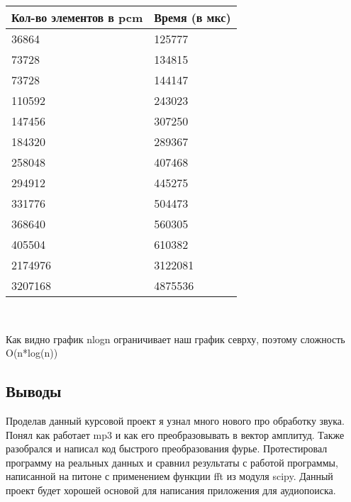 \documentclass[12pt]{article}
\begin{document}
    \begin{tabular}{ | l | l | }
        \hline
            Кол-во элементов в pcm & Время (в мкс) \\ \hline
            36864  & 125777 \\
            73728  & 134815 \\
            73728  & 144147 \\
            110592 & 243023 \\
            147456 & 307250 \\
            184320 & 289367 \\
            258048 & 407468 \\
            294912 & 445275 \\
            331776 & 504473 \\
            368640 & 560305 \\
            405504 & 610382 \\
            2174976 & 3122081 \\
            3207168 & 4875536 \\
        \hline
    \end{tabular}
 \\

    
    Как видно график nlogn ограничивает наш график севрху, поэтому сложность O(n*log(n))

    \subsection*{Выводы}

    Проделав данный курсовой проект я узнал много нового про обработку звука. Понял как работает mp3 и как его преобразовывать в вектор амплитуд. Также разобрался и написал код быстрого преобразования фурье. Протестировал программу на реальных данных и сравнил результаты с работой программы, написанной на питоне с применением функции fft из модуля scipy. Данный проект будет хорошей основой для написания приложения для аудиопоиска. 

    
\end{document}
